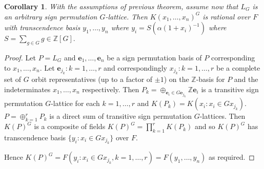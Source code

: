 \documentclass{article}
\theoremstyle{plain}
\newtheorem{corollary}[theorem]{Corollary}
\theoremstyle{definition}
\newcommand{\Z}{\ensuremath{\mathbb{Z}}}
\begin{document}
\begin{corollary}
With the assumptions of previous theorem, assume now that $L_G$ is an arbitrary sign permutation $G$-lattice. Then $ K(x_1,\ldots , x_n)^G$ is rational over $F$ with transcendence basis $y_1, \ldots , y_n$ where $y_i = S(\alpha (1+x_i)^{-1})$ where $S = \sum_{g\in G}g \in \Z[G].$ 
\end{corollary}
\begin{proof}
Let $P = L_G$ and $\textbf{e}_1, \ldots , \textbf{e}_n$ be a sign permutation basis of $P$ corresponding to $x_1, \ldots, x_n$. Let $\textbf{e}_{j_k}: k = 1, \ldots, r$ and correspondingly $x_{j_k}: k = 1, \ldots, r$ be a complete set of $G$ orbit representatives (up to a factor of $\pm 1$) on the $\Z$-basis for $P$ and the indeterminates $x_1, \ldots, x_n$ respectively. Then $P_k = \oplus_{ \textbf{e}_i \in G \textbf{e}_{j_{k}} } \Z \textbf{e}_i$ is a transitive sign permutation $G$-lattice for each $k = 1, \ldots , r$ and $K(P_k) = K(x_i : x_i \in Gx_{j_k})$.$P = \oplus^r_{k =1} P_k$ is a direct sum of transitive sign permutation $G$-lattices. Then $K(P)^G$ is a composite of fields $K(P)^G = \prod^r_{k =1}K(P_k)$ and so $K(P)^G$ has transcendence basis $\lbrace y_i: x_i \in Gx_{j_k}\rbrace$ over $F$.

Hence $K(P)^G = F(y_i : x_i \in Gx_{j_k}, k = 1, \ldots,r) = F(y_1, \ldots,y_n)$ as required.

\end{proof}
\end{document}
